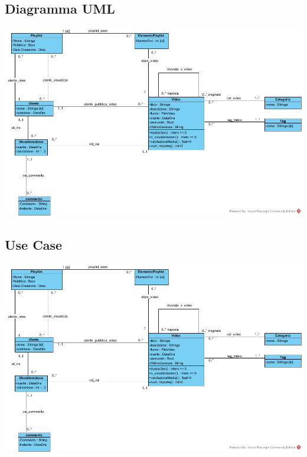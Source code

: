\documentclass[12pt, letterpaper]{article}
\begin{document}
\subsection{Diagramma UML}
\begin{center}
    \includegraphics[width=1.1\textwidth ]{UML.jpg}
\end{center}\newpage
\subsection{Use Case}
\begin{center}
    \includegraphics[width=1.1\textwidth ]{UseCase.jpg}
\end{center}
\end{document}
